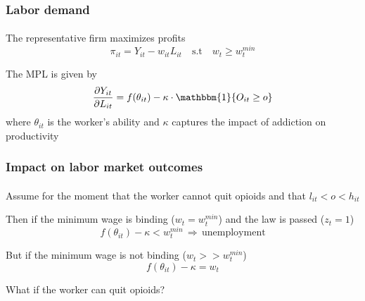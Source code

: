 \begin{frame}

    \frametitle{Labor demand} %
    \framesubtitle{}  %
    \rmfamily %

    \begin{wideitemize}
        \item The \textcolor{fblu}{representative firm} maximizes profits
        \[
        \pi_{it} = Y_{it} - w_{it}L_{it} \quad \text{s.t} \quad w_t \geq w^{min}_t
        \]
        \vspace{-15pt}
        \item The \textcolor{fblu}{MPL} is given by
        \[
        \dfrac{\partial Y_{it}}{\partial L_{it}} = f(\theta_{it}) - \kappa\cdot\mathbbm{1}\{O_{it}\geq o\}
        \]
        where \(\theta_{it}\) is the \textcolor{fblu}{worker's ability} and \(\kappa\) captures the \textcolor{fblu}{impact of addiction on productivity}
    \end{wideitemize}

\end{frame}


\begin{frame}

    \frametitle{Impact on labor market outcomes} %
    \framesubtitle{}  %
    \rmfamily %

    \begin{wideitemize}
        \item Assume for the moment that \textcolor{fblu}{the worker cannot quit opioids} and that \(l_{it} < o < h_{it}\)
        \item Then if the \textcolor{fblu}{minimum wage is binding} (\(w_{t} = w^{min}_t\)) and \textcolor{fblu}{the law is passed} (\(z_t = 1\))
        \[
        f(\theta_{it}) - \kappa < w^{min}_t \,\Rightarrow\, \text{unemployment}
        \]
        \vspace{-15pt}
        \item But if the \textcolor{fblu}{minimum wage is not binding} (\(w_{t} >> w^{min}_t\)) 
        \[
        f(\theta_{it}) - \kappa = w_t 
        \]
        \vspace{-15pt}
        \item What if the worker can quit opioids?
    \end{wideitemize}
    \hyperlink{quitting}{} 
\end{frame}

